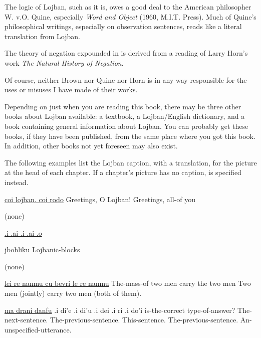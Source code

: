 The logic of Lojban, such as it is, owes a good deal to the American philosopher W. v.O. Quine, especially \textit{Word and Object} (1960, M.I.T. Press). Much of Quine's philosophical writings, especially on observation sentences, reads like a literal translation from Lojban.

The theory of negation expounded in  is derived from a reading of Larry Horn's work \textit{The Natural History of Negation}.

Of course, neither Brown nor Quine nor Horn is in any way responsible for the uses or misuses I have made of their works.

Depending on just when you are reading this book, there may be three other books about Lojban available: a textbook, a Lojban/English dictionary, and a book containing general information about Lojban. You can probably get these books, if they have been published, from the same place where you got this book. In addition, other books not yet foreseen may also exist.



The following examples list the Lojban caption, with a translation, for the picture at the head of each chapter. If a chapter's picture has no caption,  is specified instead.
\begin{example}
\hyperref[img:1]{coi lojban.       coi rodo} \n
Greetings, O Lojban!    Greetings, all-of you
\end{example}

\begin{example}
(none)
\end{example}

\begin{example}
\hyperref[img:3]{.i .ai .i .ai .o} \n
[untranslatable]
\end{example}

\begin{example}
\hyperref[img:4]{jbobliku} \n
Lojbanic-blocks
\end{example}

\begin{example}
(none)
\end{example}

\begin{example}
\hyperref[img:6]{lei re nanmu cu bevri le re nanmu} \n
The-mass-of two men carry the two men \n
Two men (jointly) carry two men (both of them).
\end{example}

\begin{example}
\hyperref[img:7]{ma drani danfu} \n
\T	.i di'e \n
\T	.i di'u \n
\T	.i dei \n
\T	.i ri \n
\T	.i do'i  is-the-correct type-of-answer? \n
\T	The-next-sentence. \n
\T	The-previous-sentence. \n
\T	This-sentence. \n
\T	The-previous-sentence. \n
\T	An-unspecified-utterance.
\end{example}

